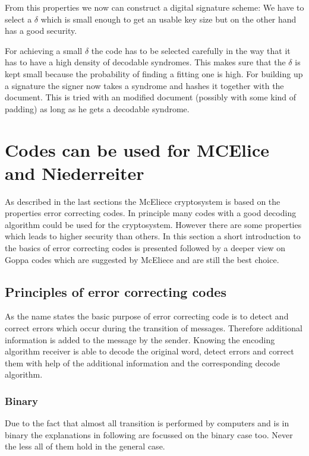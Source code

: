 From this properties we now can construct a digital signature scheme: We have to select a $\delta$ which is small enough to get an usable key size but on the other hand has a good security. 

For achieving a small $\delta$ the code has to be selected carefully in the way that it has to have a high density of decodable syndromes. This makes sure that the $\delta$ is kept small because the probability of finding a fitting one is high. For building up a signature the signer now takes a syndrome and hashes it together with the document. This is tried with an modified document (possibly with some kind of padding) as long as he gets a decodable syndrome. \cite{courtois2001achieve}


\section{Codes can be used for MCElice and Niederreiter} 
As described in the last sections the McEliece cryptosystem is based on the properties error correcting codes. In principle many codes with a good decoding algorithm could be used for the cryptosystem. However there are some properties which leads to higher security than others. In this section a short introduction to the basics of error correcting codes is presented followed by a deeper view on Goppa codes which are suggested by McEliece and are still the best choice.

\subsection*{Principles of error correcting codes}
As the name states the basic purpose of error correcting code is to detect and correct errors which occur during the transition of messages. Therefore additional information is added to the message by the sender. Knowing the encoding algorithm receiver is able to decode the original word, detect errors and correct them with help of the additional information and the corresponding decode algorithm. 
\subsubsection*{Binary} Due to the fact that almost all transition is performed by computers and is in binary the explanations in following are focussed on the binary case too. Never the less all of them hold in the general case. 

